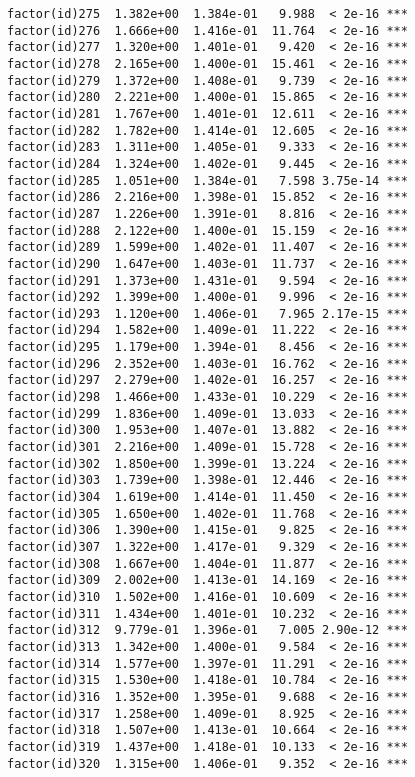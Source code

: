 \documentclass[]{article}
\begin{document}
\begin{verbatim}
factor(id)275  1.382e+00  1.384e-01   9.988  < 2e-16 ***
factor(id)276  1.666e+00  1.416e-01  11.764  < 2e-16 ***
factor(id)277  1.320e+00  1.401e-01   9.420  < 2e-16 ***
factor(id)278  2.165e+00  1.400e-01  15.461  < 2e-16 ***
factor(id)279  1.372e+00  1.408e-01   9.739  < 2e-16 ***
factor(id)280  2.221e+00  1.400e-01  15.865  < 2e-16 ***
factor(id)281  1.767e+00  1.401e-01  12.611  < 2e-16 ***
factor(id)282  1.782e+00  1.414e-01  12.605  < 2e-16 ***
factor(id)283  1.311e+00  1.405e-01   9.333  < 2e-16 ***
factor(id)284  1.324e+00  1.402e-01   9.445  < 2e-16 ***
factor(id)285  1.051e+00  1.384e-01   7.598 3.75e-14 ***
factor(id)286  2.216e+00  1.398e-01  15.852  < 2e-16 ***
factor(id)287  1.226e+00  1.391e-01   8.816  < 2e-16 ***
factor(id)288  2.122e+00  1.400e-01  15.159  < 2e-16 ***
factor(id)289  1.599e+00  1.402e-01  11.407  < 2e-16 ***
factor(id)290  1.647e+00  1.403e-01  11.737  < 2e-16 ***
factor(id)291  1.373e+00  1.431e-01   9.594  < 2e-16 ***
factor(id)292  1.399e+00  1.400e-01   9.996  < 2e-16 ***
factor(id)293  1.120e+00  1.406e-01   7.965 2.17e-15 ***
factor(id)294  1.582e+00  1.409e-01  11.222  < 2e-16 ***
factor(id)295  1.179e+00  1.394e-01   8.456  < 2e-16 ***
factor(id)296  2.352e+00  1.403e-01  16.762  < 2e-16 ***
factor(id)297  2.279e+00  1.402e-01  16.257  < 2e-16 ***
factor(id)298  1.466e+00  1.433e-01  10.229  < 2e-16 ***
factor(id)299  1.836e+00  1.409e-01  13.033  < 2e-16 ***
factor(id)300  1.953e+00  1.407e-01  13.882  < 2e-16 ***
factor(id)301  2.216e+00  1.409e-01  15.728  < 2e-16 ***
factor(id)302  1.850e+00  1.399e-01  13.224  < 2e-16 ***
factor(id)303  1.739e+00  1.398e-01  12.446  < 2e-16 ***
factor(id)304  1.619e+00  1.414e-01  11.450  < 2e-16 ***
factor(id)305  1.650e+00  1.402e-01  11.768  < 2e-16 ***
factor(id)306  1.390e+00  1.415e-01   9.825  < 2e-16 ***
factor(id)307  1.322e+00  1.417e-01   9.329  < 2e-16 ***
factor(id)308  1.667e+00  1.404e-01  11.877  < 2e-16 ***
factor(id)309  2.002e+00  1.413e-01  14.169  < 2e-16 ***
factor(id)310  1.502e+00  1.416e-01  10.609  < 2e-16 ***
factor(id)311  1.434e+00  1.401e-01  10.232  < 2e-16 ***
factor(id)312  9.779e-01  1.396e-01   7.005 2.90e-12 ***
factor(id)313  1.342e+00  1.400e-01   9.584  < 2e-16 ***
factor(id)314  1.577e+00  1.397e-01  11.291  < 2e-16 ***
factor(id)315  1.530e+00  1.418e-01  10.784  < 2e-16 ***
factor(id)316  1.352e+00  1.395e-01   9.688  < 2e-16 ***
factor(id)317  1.258e+00  1.409e-01   8.925  < 2e-16 ***
factor(id)318  1.507e+00  1.413e-01  10.664  < 2e-16 ***
factor(id)319  1.437e+00  1.418e-01  10.133  < 2e-16 ***
factor(id)320  1.315e+00  1.406e-01   9.352  < 2e-16 ***

\end{verbatim}
\end{document}
